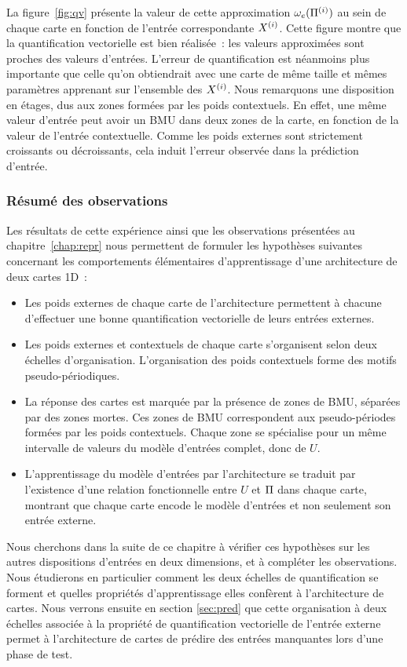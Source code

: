 \documentclass[../main]{subfiles}
\begin{document}
La figure~\ref{fig:qv} présente la valeur de cette approximation $\omega_{e}(\Pi^{({i})})$ au sein de chaque carte en fonction de l'entrée correspondante $X^{({i})}$. 
Cette figure montre que la quantification vectorielle est bien réalisée~: les valeurs approximées sont proches des valeurs d'entrées.
L'erreur de quantification est néanmoins plus importante que celle qu'on obtiendrait avec une carte de même taille et mêmes paramètres apprenant sur l'ensemble des $X^{({i})}$. 
Nous remarquons une disposition en étages, dus aux zones formées par les poids contextuels.
En effet, une même valeur d'entrée peut avoir un BMU dans deux zones de la carte, en fonction de la valeur de l'entrée contextuelle. 
Comme les poids externes sont strictement croissants ou décroissants, cela induit l'erreur observée dans la prédiction d'entrée.

\subsubsection{Résumé des observations}

Les résultats de cette expérience ainsi que les observations présentées au chapitre~\ref{chap:repr} nous permettent de formuler les hypothèses suivantes concernant les comportements élémentaires d'apprentissage d'une architecture de deux cartes 1D~:

\begin{itemize}
	\item Les poids externes de chaque carte de l'architecture permettent à chacune d'effectuer une bonne quantification vectorielle de leurs entrées externes.
	\item Les poids externes et contextuels de chaque carte s'organisent selon deux échelles d'organisation. L'organisation des poids contextuels forme des motifs pseudo-périodiques.
	\item La réponse des cartes est marquée par la présence de zones de BMU, séparées par des zones mortes. Ces zones de BMU correspondent aux pseudo-périodes formées par les poids contextuels. Chaque zone se spécialise pour un même intervalle de valeurs du modèle d'entrées complet, donc de $U$.
	\item L'apprentissage du modèle d'entrées par l'architecture se traduit par l'existence d'une relation fonctionnelle entre $U$ et $\Pi$ dans chaque carte, montrant que chaque carte encode le modèle d'entrées et non seulement son entrée externe.
\end{itemize}

Nous cherchons dans la suite de ce chapitre à vérifier ces hypothèses sur les autres dispositions d'entrées en deux dimensions, et à compléter les observations.
Nous étudierons en particulier comment les deux échelles de quantification se forment et quelles propriétés d'apprentissage elles confèrent à l'architecture de cartes.
Nous verrons ensuite en section \ref{sec:pred} que cette organisation à deux échelles associée à la propriété de quantification vectorielle de l'entrée externe permet à l'architecture de cartes de prédire des entrées manquantes lors d'une phase de test.
\end{document}
